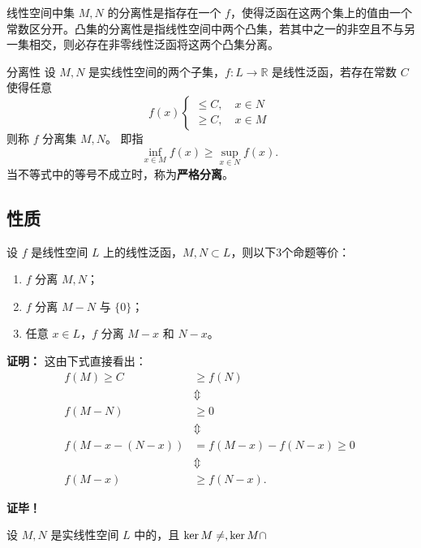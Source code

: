 

线性空间中集 $M,N$ 的分离性是指存在一个 $f$，使得泛函在这两个集上的值由一个常数区分开。凸集的分离性是指线性空间中两个凸集，若其中之一的非空且不与另一集相交，则必存在非零线性泛函将这两个凸集分离。

\begin{definition}{分离性}
设 $M,N$ 是实线性空间的两个子集，$f:L\rightarrow\mathbb R$ 是线性泛函，若存在常数 $C$ 使得任意 
\begin{equation}
f(x)\left\{\begin{aligned}\leq C,\quad x\in N\\
\geq C,\quad x\in M
\end{aligned}\right.~
\end{equation}
则称 $f$ 分离集 $M,N$。
即指
\begin{equation}
\inf_{x\in M}f(x)\geq\sup_{x\in N}f(x).~
\end{equation}
当不等式中的等号不成立时，称为\textbf{严格分离}。
\end{definition}
\subsection{性质}
\begin{theorem}{}
设 $f$ 是线性空间 $L$ 上的线性泛函，$M,N\subset L$，则以下3个命题等价：
\begin{enumerate}
\item $f$ 分离 $M,N$；
\item $f$ 分离 $M-N$ 与 $\{0\}$；
\item 任意 $x\in L$，$f$ 分离 $M-x$ 和 $N-x$。
\end{enumerate}
\end{theorem}
\textbf{证明：}
这由下式直接看出：
\begin{equation}
\begin{aligned}
f(M)\geq C&\geq f(N)\\
&\Updownarrow \\
f(M-N)&\geq0\\
&\Updownarrow \\
f(M-x-(N-x))&=f(M-x)-f(N-x)\geq0\\
&\Updownarrow\\
f(M-x)&\geq f(N-x).
\end{aligned}~ 
\end{equation}


\textbf{证毕！}


\begin{theorem}{}
设 $M,N$ 是实线性空间 $L$ 中的，且 $\ker M\neq\empty,\ker M\cap$
\end{theorem}



